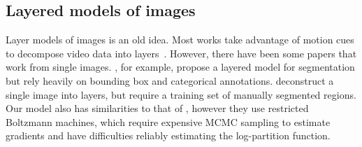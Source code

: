 \subsection{Layered models of images}\vspace{-2mm}

Layer models of images is an old idea.
Most works 
take advantage of motion cues to decompose video data into layers~\citep{wang1994representing,ayer1995layered,kannan2005generative}.
However, there have been some papers that work from single images.
\cite{yang2012layered}, for example, propose a layered model for
segmentation but rely heavily on bounding box and categorical
annotations.	
\cite{Isola2013} deconstruct a single image into layers, but require a
training set of manually segmented regions.
Our model also has similarities to that of \cite{le2011learning}, however  they use restricted Boltzmann machines, 
which require expensive MCMC sampling to estimate gradients and have difficulties reliably estimating the 
log-partition function.  
\vspace{-2mm}
	
	
	


	
	
	
		
	
	
	
	
	
	
	
